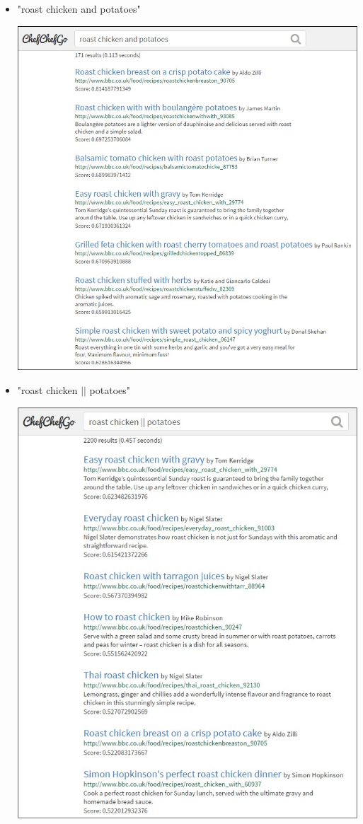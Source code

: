 \begin{itemize}
	\item "roast chicken and potatoes"
	\begin{center}
		\includegraphics[scale = 0.5]{img/query1.jpg}
	\end{center}
	
	\item "roast chicken $||$ potatoes"
	\begin{center}
		\includegraphics[scale = 0.5]{img/query2.jpg}
	\end{center}
	

\end{itemize}
